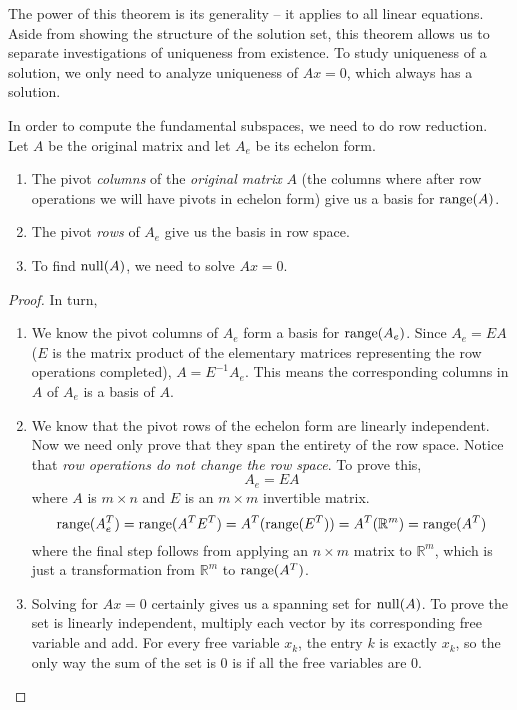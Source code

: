 The power of this theorem is its generality -- it applies to all linear equations. Aside from showing the structure of the solution set, this theorem allows us to separate investigations of uniqueness from existence. To study uniqueness of a solution, we only need to analyze uniqueness of $Ax = 0$, which always has a solution. 

\begin{theorem}
In order to compute the fundamental subspaces, we need to do row reduction. Let $A$ be the original matrix and let $A_{e}$ be its echelon form. 
\begin{enumerate}
	\item The pivot \textit{columns} of the \textit{original matrix} $A$ (the columns where after row operations we will have pivots in echelon form) give us a basis for $\operatorname{range}(A)$. 
	\item The pivot \textit{rows} of $A_{e}$ give us the basis in row space. 
	\item To find $\operatorname{null}(A)$, we need to solve $Ax = 0$. 
\end{enumerate}
\end{theorem}

\begin{proof}
In turn, 
\begin{enumerate}
	\item We know the pivot columns of $A_{e}$ form a basis for $\operatorname{range}(A_{e})$. Since $A_{e} = EA$ ($E$ is the matrix product of the elementary matrices representing the row operations completed), $A = E^{-1}A_{e}$. This means the corresponding columns in $A$ of $A_{e}$ is a basis of $A$. 
	
	\item We know that the pivot rows of the echelon form are linearly independent. Now we need only prove that they span the entirety of the row space. Notice that \textit{row operations do not change the row space}. To prove this, 
	$$A_{e} = EA$$
	where $A$ is $m \times n$ and $E$ is an $m \times m$ invertible matrix. 
	$$\operatorname{range}(A_{e}^{T}) = \operatorname{range}(A^{T} E^{T}) = A^{T} (\operatorname{range}(E^{T})) = A^{T} (\mathbb{R}^{m}) = \operatorname{range}(A^{T})$$
	where the final step follows from applying an $n \times m$ matrix to $\mathbb{R}^{m}$, which is just a transformation from $\mathbb{R}^{m}$ to $\operatorname{range}(A^{T})$. 
	
	\item Solving for $Ax = 0$ certainly gives us a spanning set for  $\operatorname{null}(A)$. To prove the set is linearly independent, multiply each vector by its corresponding free variable and add. For every free variable $x_{k}$, the entry $k$ is exactly $x_{k}$, so the only way the sum of the set is $0$ is if all the free variables are $0$. 
\end{enumerate}
\end{proof}

